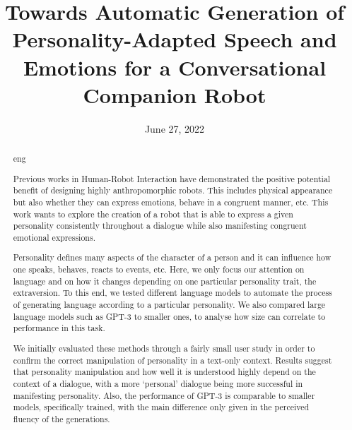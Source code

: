 \documentclass[nomenclature, english, biblatex]{kththesis}
\title{Towards Automatic Generation of Personality-Adapted Speech and Emotions for a Conversational Companion Robot}
\subtitle{}
\date{June 27, 2022}
\begin{document}

\kthcover
\titlepage
\bookinfopage

\frontmatter
\setcounter{page}{1}
\begin{abstract}
  \markboth{\abstractname}{}
\begin{scontents}[store-env=lang]
eng
\end{scontents}
\begin{scontents}[store-env=abstracts,print-env=true]
Previous works in Human-Robot Interaction have demonstrated the positive potential benefit of designing highly anthropomorphic robots. This includes physical appearance but also whether they can express emotions, behave in a congruent manner, etc. This work wants to explore the creation of a robot that is able to express a given personality consistently throughout a dialogue while also manifesting congruent emotional expressions. 

Personality defines many aspects of the character of a person and it can influence how one speaks, behaves, reacts to events, etc. Here, we only focus our attention on language and on how it changes depending on one particular personality trait, the extraversion. To this end, we tested different language models to automate the process of generating language according to a particular personality. We also compared large language models such as GPT-3 to smaller ones, to analyse how size can correlate to performance in this task. 

We initially evaluated these methods through a fairly small user study in order to confirm the correct manipulation of personality in a text-only context. Results suggest that personality manipulation and how well it is understood highly depend on the context of a dialogue, with a more `personal' dialogue being more successful in manifesting personality. Also, the performance of GPT-3 is comparable to smaller models, specifically trained, with the main difference only given in the perceived fluency of the generations. 


\end{scontents}
\end{abstract}
\end{document}
